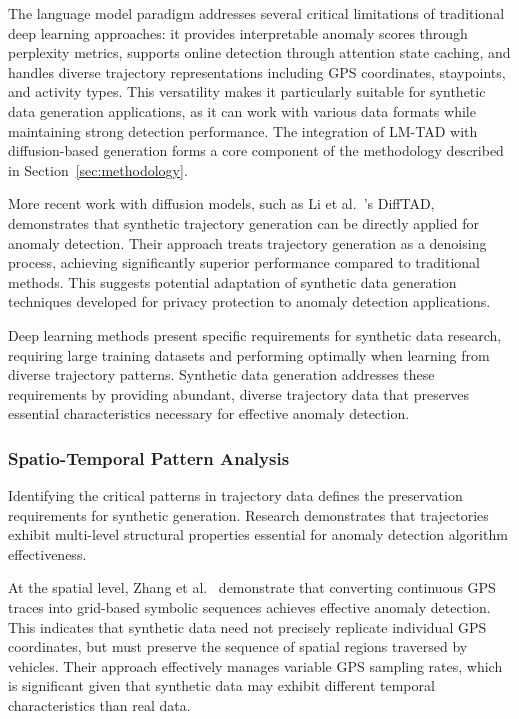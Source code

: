 \documentclass[runningheads]{llncs}
\begin{document}
The language model paradigm addresses several critical limitations of traditional deep learning approaches: it provides interpretable anomaly scores through perplexity metrics, supports online detection through attention state caching, and handles diverse trajectory representations including GPS coordinates, staypoints, and activity types. This versatility makes it particularly suitable for synthetic data generation applications, as it can work with various data formats while maintaining strong detection performance. The integration of LM-TAD with diffusion-based generation forms a core component of the methodology described in Section~\ref{sec:methodology}.

More recent work with diffusion models, such as Li et al.~\cite{liDiffusionModelsVehicle2023}'s DiffTAD, demonstrates that synthetic trajectory generation can be directly applied for anomaly detection. Their approach treats trajectory generation as a denoising process, achieving significantly superior performance compared to traditional methods. This suggests potential adaptation of synthetic data generation techniques developed for privacy protection to anomaly detection applications.

Deep learning methods present specific requirements for synthetic data research, requiring large training datasets and performing optimally when learning from diverse trajectory patterns. Synthetic data generation addresses these requirements by providing abundant, diverse trajectory data that preserves essential characteristics necessary for effective anomaly detection.

\subsubsection{Spatio-Temporal Pattern Analysis}
\label{sec:spatio-temporal}

Identifying the critical patterns in trajectory data defines the preservation requirements for synthetic generation. Research demonstrates that trajectories exhibit multi-level structural properties essential for anomaly detection algorithm effectiveness.

At the spatial level, Zhang et al.~\cite{zhangIBATDetectingAnomalous2011} demonstrate that converting continuous GPS traces into grid-based symbolic sequences achieves effective anomaly detection. This indicates that synthetic data need not precisely replicate individual GPS coordinates, but must preserve the sequence of spatial regions traversed by vehicles. Their approach effectively manages variable GPS sampling rates, which is significant given that synthetic data may exhibit different temporal characteristics than real data.
\end{document}
